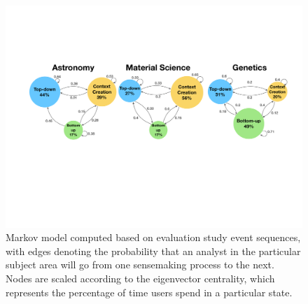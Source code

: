 \begin{figure}[h!]
  \includegraphics[width=\linewidth]{figures/markov_transition.pdf}
  \caption{Markov model computed based on evaluation study event sequences, with edges denoting the probability that an analyst in the particular subject area will go from one sensemaking process to the next. Nodes are scaled according to the eigenvector centrality, which represents the percentage of time users spend in a particular state.}\label{fig:transition}
\end{figure}
